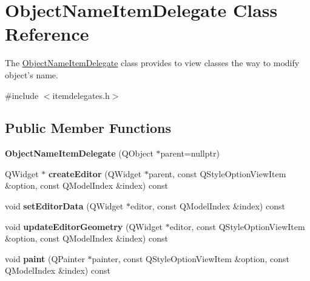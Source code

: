 \hypertarget{class_object_name_item_delegate}{\section{\-Object\-Name\-Item\-Delegate \-Class \-Reference}
\label{class_object_name_item_delegate}
}


\-The \hyperlink{class_object_name_item_delegate}{\-Object\-Name\-Item\-Delegate} class provides to view classes the way to modify object's name.  




{\ttfamily \#include $<$itemdelegates.\-h$>$}

\subsection*{\-Public \-Member \-Functions}
\begin{DoxyCompactItemize}
\item 
\hypertarget{class_object_name_item_delegate_a29ea6448c3b0db37a948cfb7802ce6b5}{{\bfseries \-Object\-Name\-Item\-Delegate} (\-Q\-Object $\ast$parent=nullptr)}\label{class_object_name_item_delegate_a29ea6448c3b0db37a948cfb7802ce6b5}

\item 
\hypertarget{class_object_name_item_delegate_a3e4e9d436c524a21953e61e0fcb9b798}{\-Q\-Widget $\ast$ {\bfseries create\-Editor} (\-Q\-Widget $\ast$parent, const \-Q\-Style\-Option\-View\-Item \&option, const \-Q\-Model\-Index \&index) const }\label{class_object_name_item_delegate_a3e4e9d436c524a21953e61e0fcb9b798}

\item 
\hypertarget{class_object_name_item_delegate_a97d0e306dd9de35e4db9074144b754e1}{void {\bfseries set\-Editor\-Data} (\-Q\-Widget $\ast$editor, const \-Q\-Model\-Index \&index) const }\label{class_object_name_item_delegate_a97d0e306dd9de35e4db9074144b754e1}

\item 
\hypertarget{class_object_name_item_delegate_a19c1f716cc9ae25eb428e2a8a976f6da}{void {\bfseries update\-Editor\-Geometry} (\-Q\-Widget $\ast$editor, const \-Q\-Style\-Option\-View\-Item \&option, const \-Q\-Model\-Index \&index) const }\label{class_object_name_item_delegate_a19c1f716cc9ae25eb428e2a8a976f6da}

\item 
\hypertarget{class_object_name_item_delegate_a8b30c82a50aedb27bdfc34489ae09809}{void {\bfseries paint} (\-Q\-Painter $\ast$painter, const \-Q\-Style\-Option\-View\-Item \&option, const \-Q\-Model\-Index \&index) const }\label{class_object_name_item_delegate_a8b30c82a50aedb27bdfc34489ae09809}

\end{DoxyCompactItemize}


